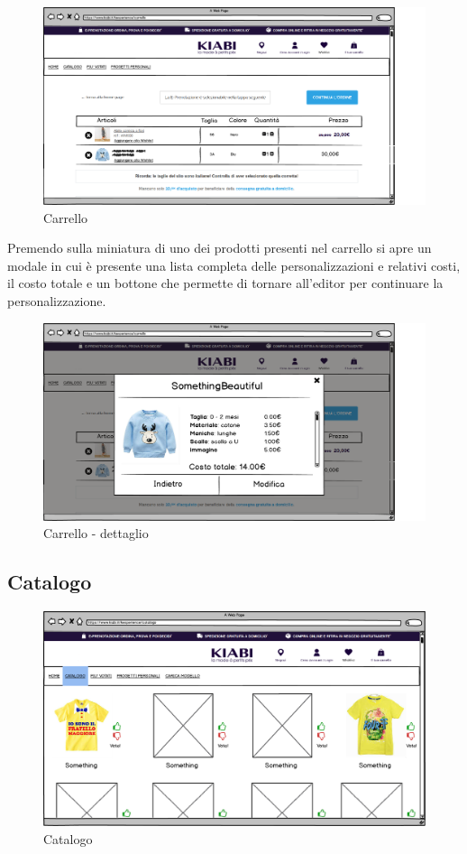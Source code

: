 \documentclass[12pt,italian,]{report}
\begin{document}
\begin{figure}[h]
\centering
\includegraphics{img/balsamiq/Carrello.png}
\caption{Carrello}
\end{figure}

Premendo sulla miniatura di uno dei prodotti presenti nel carrello si
apre un modale in cui è presente una lista completa delle
personalizzazioni e relativi costi, il costo totale e un bottone che
permette di tornare all'editor per continuare la personalizzazione.

\begin{figure}[h]
\centering
\includegraphics{img/balsamiq/Carrellodettagli.png}
\caption{Carrello - dettaglio}
\end{figure}

\hypertarget{catalogo}{%
\subsection{Catalogo}\label{catalogo}}

\begin{figure}[h]
\centering
\includegraphics{img/balsamiq/Catalogo.png}
\caption{Catalogo}
\end{figure}
\end{document}
